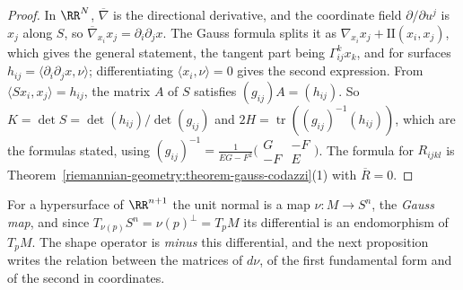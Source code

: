 \begin{proof}
In $\RR^N$, $\overline{\nabla}$ is the directional derivative, and the coordinate field $\partial/\partial u^j$ is $x_j$ along $S$, so
$\overline{\nabla}_{x_i}x_j = \partial_i\partial_jx$. The Gauss formula splits it as $\nabla_{x_i}x_j + \mathrm{II}(x_i, x_j)$, which gives the general statement, the tangent part
being $\Gamma^k_{ij}x_k$, and for surfaces $h_{ij} = \langle\partial_i\partial_jx, \nu\rangle$; differentiating $\langle x_i, \nu\rangle = 0$ gives the second expression. From
$\langle Sx_i, x_j\rangle = h_{ij}$, the matrix $A$ of $S$ satisfies $(g_{ij})A = (h_{ij})$. So $K = \det S = \det(h_{ij})/\det(g_{ij})$ and
$2H = \operatorname{tr}((g_{ij})^{-1}(h_{ij}))$, which are the formulas stated, using $(g_{ij})^{-1} = \frac{1}{EG - F^2}\bigl(\begin{smallmatrix} G & -F\\ -F & E\end{smallmatrix}\bigr)$. The
formula for $R_{ijkl}$ is Theorem~\ref{riemannian-geometry:theorem-gauss-codazzi}(1) with $\overline{R} = 0$.
\end{proof}

For a hypersurface of $\RR^{n+1}$ the unit normal is a map $\nu \colon M \to S^n$, the \emph{Gauss map}, and since $T_{\nu(p)}S^n = \nu(p)^\perp = T_pM$ its
differential is an endomorphism of $T_pM$. The shape operator is \emph{minus} this differential, and the next proposition writes the relation between the matrices
of $d\nu$, of the first fundamental form and of the second in coordinates.

